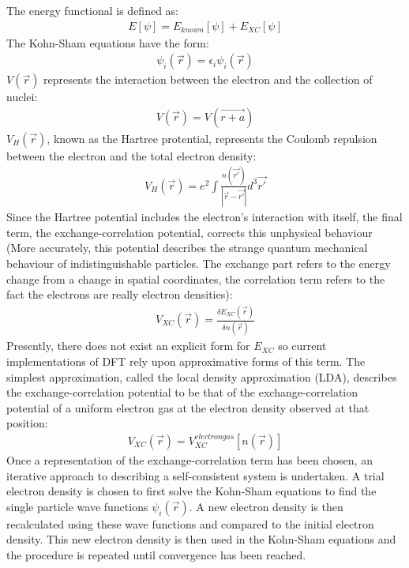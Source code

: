 \documentclass{article}
\numberwithin{equation}{section}
\begin{document}
The energy functional is defined as:
\begin{align*}
	E[\psi]=E_{known}[\psi]+E_{XC}[\psi]
\end{align*}
The Kohn-Sham equations have the form:
\begin{align*}
	[\frac{\hbar^2}{2m}\nabla^2+V(\vec{r})+V_H(\vec{r})+V_{XC}]\psi_i(\vec{r})=\epsilon_i\psi_i(\vec{r})
\end{align*}
$V(\vec{r})$ represents the interaction between the electron and the collection of nuclei:
\begin{align*}
	V(\vec{r})=V(\vec{r+a})
\end{align*}
$V_H(\vec{r})$, known as the Hartree protential, represents the Coulomb repulsion between the electron and the total electron density:
\begin{align*}
	V_H(\vec{r})=e^2\int\frac{n(\vec{r'})}{|\vec{r}-\vec{r'}|}d^3\vec{r'}
\end{align*}
Since the Hartree potential includes the electron's interaction with itself, the final term, the exchange-correlation potential, corrects this unphysical behaviour (More accurately, this potential describes the strange quantum mechanical behaviour of indistinguishable particles. The exchange part refers to the energy change from a change in spatial coordinates, the correlation term refers to the fact the electrons are really electron densities):
\begin{align*}
	V_{XC}(\vec{r})=\frac{\delta E_{XC}(\vec{r})}{\delta n(\vec{r})}
\end{align*}
Presently, there does not exist an explicit form for $E_{XC}$ so current implementations of DFT rely upon approximative forms of this term. The simplest approximation, called the local density approximation (LDA), describes the exchange-correlation potential to be that of the exchange-correlation potential of a uniform electron gas at the electron density observed at that position:
\begin{align*}
	V_{XC}(\vec{r})=V_{XC}^{electron gas}[n(\vec{r})]
\end{align*}
Once a representation of the exchange-correlation term has been chosen, an iterative approach to describing a self-consistent system is undertaken. A trial electron density is chosen to first solve the Kohn-Sham equations to find the single particle wave functions $\psi_i(\vec{r})$. A new electron density is then recalculated using these wave functions and compared to the initial electron density. This new electron density is then used in the Kohn-Sham equations and the procedure is repeated until convergence has been reached.
\end{document}
